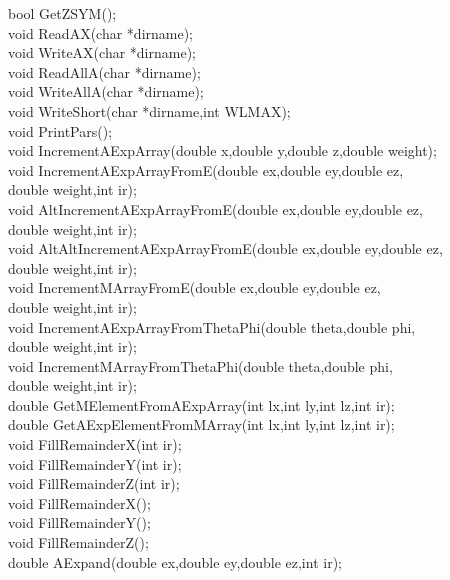 \documentclass[10pt]{article}
\def\tab{\hspace*{9pt}}
\begin{document}
{\tab \tab bool GetZSYM();\\
\tab \tab void ReadAX(char *dirname);\\
\tab \tab void WriteAX(char *dirname);\\
\tab \tab void ReadAllA(char *dirname);\\
\tab \tab void WriteAllA(char *dirname);\\
\tab \tab void WriteShort(char *dirname,int WLMAX);\\
\tab \tab void PrintPars();\\
\tab \tab void IncrementAExpArray(double x,double y,double z,double weight);\\
\tab \tab void IncrementAExpArrayFromE(double ex,double ey,double ez,\\
\tab \tab double weight,int ir);\\
\tab \tab void AltIncrementAExpArrayFromE(double ex,double ey,double ez,\\
\tab \tab double weight,int ir);\\
\tab \tab void AltAltIncrementAExpArrayFromE(double ex,double ey,double ez,\\
\tab \tab double weight,int ir);\\
\tab \tab void IncrementMArrayFromE(double ex,double ey,double ez,\\
\tab \tab double weight,int ir);\\
\tab \tab void IncrementAExpArrayFromThetaPhi(double theta,double phi,\\
\tab \tab double weight,int ir);\\
\tab \tab void IncrementMArrayFromThetaPhi(double theta,double phi,\\
\tab \tab double weight,int ir);\\
\tab \tab double GetMElementFromAExpArray(int lx,int ly,int lz,int ir);\\
\tab \tab double GetAExpElementFromMArray(int lx,int ly,int lz,int ir);\\
\tab \tab void FillRemainderX(int ir);\\
\tab \tab void FillRemainderY(int ir);\\
\tab \tab void FillRemainderZ(int ir);\\
\tab \tab void FillRemainderX();\\
\tab \tab void FillRemainderY();\\
\tab \tab void FillRemainderZ();\\
\tab \tab double AExpand(double ex,double ey,double ez,int ir);\\
}
\end{document}
